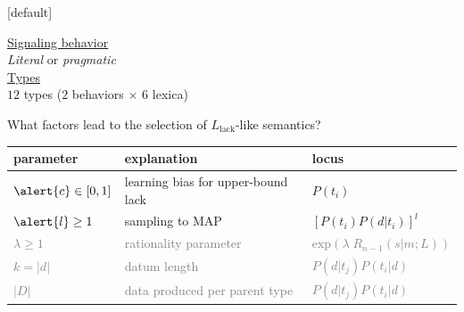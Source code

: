 \documentclass{beamer} %
\makeatletter
\newenvironment{withoutheadline}{
        \setbeamertemplate{headline}[default]
        \def\beamer@entrycode{\vspace*{-\headheight}}
    }{}
\makeatother
\begin{document}
\begin{withoutheadline}
\begin{frame}
%

\underline{Signaling behavior}\\ {\em Literal} or {\em pragmatic}\\[0.75cm]
\underline{Types}\\ $12$ types ($2$ behaviors $\times$ $6$ lexica)
\end{frame}

\begin{frame} 
\begin{center}What factors lead to the selection of $L_{\text{lack}}$-like semantics?\end{center}
\bigskip
\begin{table}
\centering
\begin{tabular}{l|l|l}
    parameter & explanation & locus\\ \hline
    $\alert{c} \in [0,1]$ & learning bias for upper-bound lack &  $P(t_i)$\\
    $\alert{l} \geq 1$ & sampling to MAP & $[P(t_i)P(d|t_i)]^l$\\
    \textcolor{gray}{$\lambda \geq 1$} & \textcolor{gray}{rationality parameter} & \textcolor{gray}{$\text{exp}(\lambda \; R_{n-1}(s|m;L))$}\\
    \textcolor{gray}{$k = |d|$} & \textcolor{gray}{datum length} & \textcolor{gray}{$P(d|t_j)P(t_i|d)$}\\
    \textcolor{gray}{$|D|$} & \textcolor{gray}{data produced per parent type} & \textcolor{gray}{$P(d|t_j)P(t_i|d)$}
\end{tabular}
\end{table}
\end{frame}


\end{withoutheadline}
\end{document}
